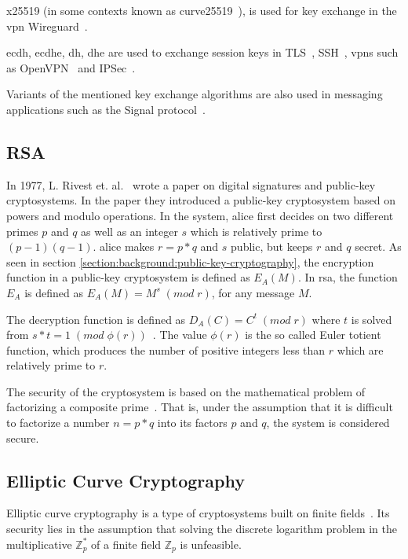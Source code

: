 \gls{x25519} (in some contexts known as \gls{curve25519}~\cite{25519naming}), is used for key exchange in the \gls{vpn} Wireguard~\cite{wireguard2020}.

\gls{ecdh}, \gls{ecdhe}, \gls{dh}, \gls{dhe} are used to exchange session keys in TLS~\cite{rfc8446}, SSH~\cite{williams2011}, \glspl{vpn} such as OpenVPN~\cite{openvpn} and IPSec~\cite{rfc2409}.

Variants of the mentioned key exchange algorithms are also used in messaging applications such as the Signal protocol~\cite{gordon2017}.

\subsection{RSA}

In 1977, L. Rivest et. al.~\cite{rsa1977} wrote a paper on digital signatures and public-key cryptosystems. In the paper they introduced a public-key cryptosystem based on powers and modulo operations. In the system, \gls{alice} first decides on two different primes $p$ and $q$ as well as an integer $s$ which is relatively prime to $(p-1)(q-1)$. \gls{alice} makes $r=p*q$ and $s$ public, but keeps $r$ and $q$ secret. As seen in section \ref{section:background:public-key-cryptography}, the encryption function in a public-key cryptosystem is defined as $E_A(M)$. In \gls{rsa}, the function $E_A$ is defined as $E_A(M)=M^s\;(mod\;r)$, for any message $M$.

The decryption function is defined as $D_A(C)=C^t\;(mod\;r)$ where $t$ is solved from $s*t=1\;(mod\;\phi(r))$~\cite{rsa1977}. The value $\phi(r)$ is the so called Euler totient function, which produces the number of positive integers less than $r$ which are relatively prime to $r$.

The security of the cryptosystem is based on the mathematical problem of factorizing a composite prime~\cite{rsa1977}. That is, under the assumption that it is difficult to factorize a number $n=p*q$ into its factors $p$ and $q$, the system is considered secure.

\subsection{Elliptic Curve Cryptography}

Elliptic curve cryptography is a type of cryptosystems built on finite fields~\cite{delfs2007}. Its security lies in the assumption that solving the discrete logarithm problem in the multiplicative $\mathbb{Z}_p^*$ of a finite field $\mathbb{Z}_p$ is unfeasible.

